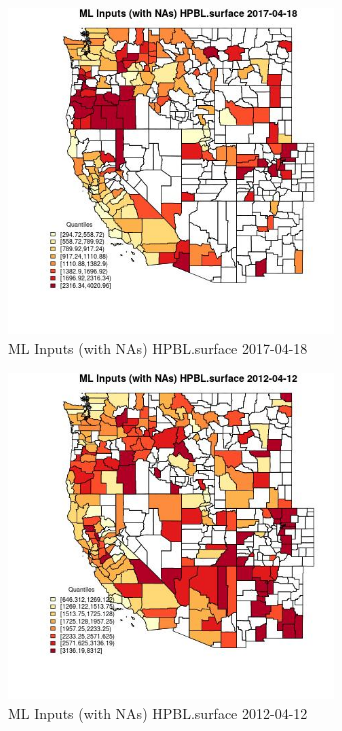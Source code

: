\begin{figure} 
\centering  
\includegraphics[width=0.77\textwidth]{Code_Outputs/Report_ML_input_PM25_Step4_part_e_de_duplicated_aves_compiled_2019-05-14wNAs_CountyHPBLsurfaceMean2017-04-18_2017-04-18.jpg} 
\caption{\label{fig:Report_ML_input_PM25_Step4_part_e_de_duplicated_aves_compiled_2019-05-14wNAsCountyHPBLsurfaceMean2017-04-18_2017-04-18}ML Inputs (with NAs) HPBL.surface 2017-04-18} 
\end{figure} 
 

\clearpage 

\begin{figure} 
\centering  
\includegraphics[width=0.77\textwidth]{Code_Outputs/Report_ML_input_PM25_Step4_part_e_de_duplicated_aves_compiled_2019-05-14wNAs_CountyHPBLsurfaceMean2012-04-12_2012-04-12.jpg} 
\caption{\label{fig:Report_ML_input_PM25_Step4_part_e_de_duplicated_aves_compiled_2019-05-14wNAsCountyHPBLsurfaceMean2012-04-12_2012-04-12}ML Inputs (with NAs) HPBL.surface 2012-04-12} 
\end{figure} 
 

